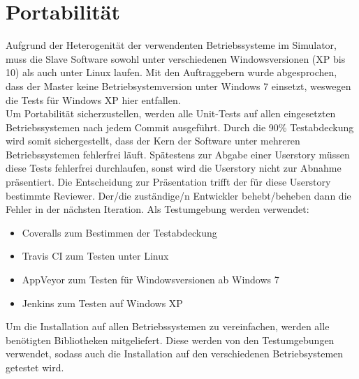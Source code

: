 \documentclass[accentcolor=tud9c,12pt,paper=a4]{tudreport}
\begin{document}
		\section{Portabilität}
		Aufgrund der Heterogenität der verwendenten Betriebssysteme im
		Simulator, muss die Slave Software sowohl unter verschiedenen Windowsversionen
		(XP bis 10) als auch unter Linux laufen.
		Mit den Auftraggebern wurde abgesprochen, dass der Master keine 
		Betriebsystemversion unter Windows 7 einsetzt, weswegen die Tests für Windows
		XP hier entfallen.
		\\[5pt]
		Um Portabilität sicherzustellen, werden alle Unit-Tests auf allen eingesetzten
		Betriebssystemen nach jedem Commit ausgeführt. Durch die 90\% Testabdeckung
		wird somit sichergestellt, dass der Kern der Software unter mehreren Betriebssystemen
		fehlerfrei läuft. Spätestens zur Abgabe einer
		Userstory müssen diese Tests fehlerfrei durchlaufen, sonst wird die Userstory nicht
		zur Abnahme präsentiert. Die Entscheidung zur Präsentation trifft der für diese
		Userstory bestimmte Reviewer. Der/die zuständige/n Entwickler behebt/beheben dann die Fehler
		in der nächsten Iteration.
		Als Testumgebung werden verwendet:
		\begin{itemize}
			\item Coveralls zum Bestimmen der Testabdeckung
			\item Travis CI zum Testen unter Linux
			\item AppVeyor zum Testen für Windowsversionen ab Windows 7
			\item Jenkins zum Testen auf Windows XP
		\end{itemize}
		Um die Installation auf allen Betriebssystemen zu vereinfachen, werden alle benötigten
		Bibliotheken mitgeliefert. Diese werden von den Testumgebungen verwendet, sodass
		auch die Installation auf den verschiedenen Betriebsystemen getestet wird.
		\newpage
\end{document}
